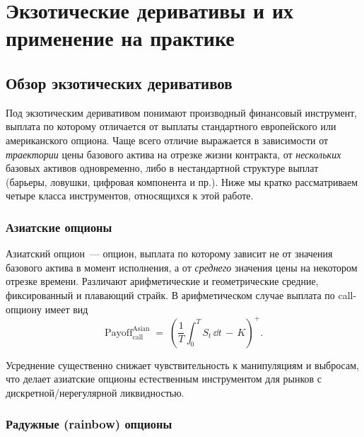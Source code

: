 \chapter{Экзотические деривативы и их применение на практике}
\label{ch:exotic}

\section{Обзор экзотических деривативов}
\label{sec:exotic-overview}

Под экзотическим деривативом понимают производный финансовый инструмент,
выплата по которому отличается от выплаты стандартного европейского или
американского опциона. Чаще всего отличие выражается в зависимости от
\emph{траектории} цены базового актива на отрезке жизни контракта,
от \emph{нескольких} базовых активов одновременно, либо в нестандартной
структуре выплат (барьеры, ловушки, цифровая компонента и пр.). Ниже мы
кратко рассматриваем четыре класса инструментов, относящихся к этой
работе.

\subsection{Азиатские опционы}
\label{sec:asian}

Азиатский опцион~--- опцион, выплата по которому зависит не от значения
базового актива в момент исполнения, а от \emph{среднего} значения цены
на некотором отрезке времени. Различают арифметические и геометрические
средние, фиксированный и плавающий страйк. В арифметическом
случае выплата по call-опциону имеет вид
\begin{equation}
\label{eq:asian-payoff}
  \text{Payoff}^{\text{Asian}}_{\text{call}}
  \;=\; \left( \frac{1}{T}\int_0^T S_t\,\dd t \,-\, K \right)^{+}.
\end{equation}

Усреднение существенно снижает чувствительность к манипуляциям и
выбросам, что делает азиатские опционы естественным инструментом для
рынков с дискретной/нерегулярной ликвидностью.

\subsection{Радужные (rainbow) опционы}
\label{sec:rainbow}

